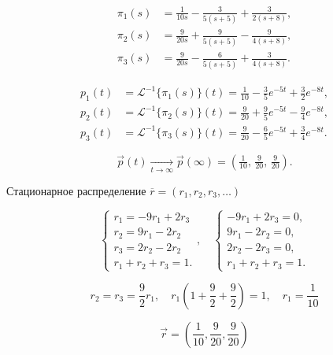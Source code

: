 \[
	\begin{aligned}
		\pi_1(s) & = \frac{1}{10s} - \frac{3}{5(s+5)} + \frac{3}{2(s+8)}, \\
		\pi_2(s) & = \frac{9}{20s} + \frac{9}{5(s+5)} - \frac{9}{4(s+8)}, \\
		\pi_3(s) & = \frac{9}{20s} - \frac{6}{5(s+5)} + \frac{3}{4(s+8)}.
	\end{aligned}
\]

\[
	\begin{aligned}
		p_1(t) & = \mathcal{L}^{-1}\{\pi_1(s)\}(t)
		= \frac{1}{10} - \frac{3}{5}e^{-5t} + \frac{3}{2}e^{-8t}, \\
		p_2(t) & = \mathcal{L}^{-1}\{\pi_2(s)\}(t)
		= \frac{9}{20} + \frac{9}{5}e^{-5t} - \frac{9}{4}e^{-8t}, \\
		p_3(t) & = \mathcal{L}^{-1}\{\pi_3(s)\}(t)
		= \frac{9}{20} - \frac{6}{5}e^{-5t} + \frac{3}{4}e^{-8t}.
	\end{aligned}
\]

\[
	\vec{p}(t)\xrightarrow [t\to\infty]{}\vec{p}(\infty)=\left(\tfrac{1}{10},\,\tfrac{9}{20},\,\tfrac{9}{20}\right).
\]

Стационарное распределение $\overline r=(r_1,r_2,r_3,\ldots)$

\[
	\begin{cases}
		r_1 = -9 r_1 + 2 r_3 \\
		r_2 = 9 r_1 -2 r_2   \\
		r_3 = 2 r_2 -2 r_2   \\
		r_1 + r_2 + r_3 = 1.
	\end{cases}
	, \quad
	\begin{cases}
		-9r_1 + 2r_3 = 0, \\
		9r_1 - 2r_2 = 0,  \\
		2r_2 - 2r_3 = 0,  \\
		r_1 + r_2 + r_3 = 1.
	\end{cases}
\]

\[
	r_2=r_3=\frac{9}{2}r_1
	, \quad
	r_1(1+\frac{9}{2}+\frac{9}{2})=1
	, \quad
	r_1=\frac{1}{10}
\]

\[
	\vec r = (\frac{1}{10}, \frac{9}{20}, \frac{9}{20})
\]